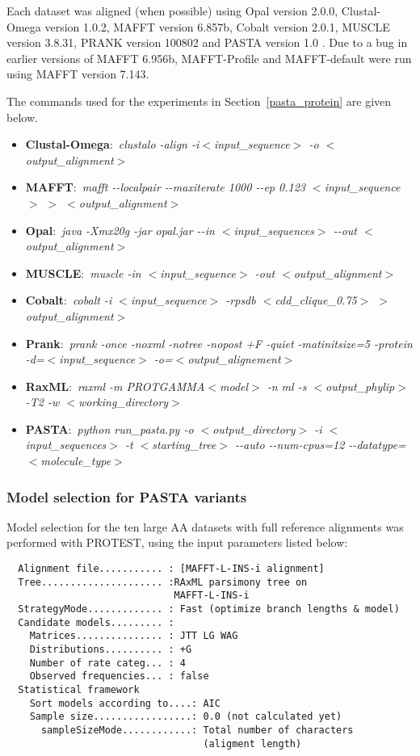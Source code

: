 Each dataset was aligned (when possible) using Opal \cite{Wheeler2007} version 2.0.0, Clustal-Omega \cite{Sievers2011} version 1.0.2, MAFFT\cite{Katoh2002,Katoh2005,Katoh2012} version 6.857b, Cobalt \cite{Papadopoulos2007} version 2.0.1, MUSCLE \cite{Edgar2004,Edgar2004a} version 3.8.31, PRANK \cite{Loytynoja2005} version 100802 and PASTA version 1.0 \cite{PASTA}.  Due to a bug in earlier versions of MAFFT 6.956b, MAFFT-Profile and MAFFT-default were run using MAFFT version 7.143.


The commands used for the experiments in Section~\ref{pasta_protein} are given below.
\begin{itemize}
\item \textbf{Clustal-Omega}:~\emph{clustalo -align -i$<$input\_sequence$>$ -o $<$output\_alignment$>$}
\item \textbf{MAFFT}:~\emph{mafft -{}-localpair -{}-maxiterate 1000 -{}-ep 0.123 $<$input\_sequence$>$ $>$ $<$output\_alignment$>$}
\item \textbf{Opal}:~\emph{java -Xmx20g -jar opal.jar -{}-in $<$input\_sequences$>$ -{}-out $<$output\_alignment$>$}
\item \textbf{MUSCLE}:~\emph{muscle -in $<$input\_sequence$>$ -out $<$output\_alignment$>$}
\item \textbf{Cobalt}:~\emph{cobalt -i $<$input\_sequence$>$ -rpsdb $<$cdd\_clique\_0.75$>$ $>$ output\_alignment$>$}
\item \textbf{Prank}:~\emph{prank -once -noxml -notree -nopost +F -quiet -matinitsize=5 -protein -d=$<$input\_sequence$>$ -o=$<$output\_alignement$>$}
\item \textbf{RaxML}:~\emph{raxml -m PROTGAMMA$<$model$>$ -n ml -s $<$output\_phylip$>$ -T2 -w $<$working\_directory$>$}
\item \textbf{PASTA}:~\emph{python run\_pasta.py -o $<$output\_directory$>$ -i  $<$input\_sequences$>$ -t $<$starting\_tree$>$ -{}-auto -{}-num-cpus=12 -{}-datatype=$<$molecule\_type$>$}
\end{itemize}
\clearpage
\subsubsection{Model selection for PASTA variants}\label{model_selection_pasta}
Model selection for the ten large AA datasets with full reference
alignments was performed with PROTEST, using the input parameters listed below:
\begin{verbatim}
  Alignment file........... : [MAFFT-L-INS-i alignment]
  Tree..................... :RAxML parsimony tree on 
                             MAFFT-L-INS-i
  StrategyMode............. : Fast (optimize branch lengths & model)
  Candidate models......... : 
    Matrices............... : JTT LG WAG 
    Distributions.......... : +G 
    Number of rate categ... : 4
    Observed frequencies... : false
  Statistical framework
    Sort models according to....: AIC
    Sample size.................: 0.0 (not calculated yet)
      sampleSizeMode............: Total number of characters 
                                  (aligment length)
\end{verbatim}

